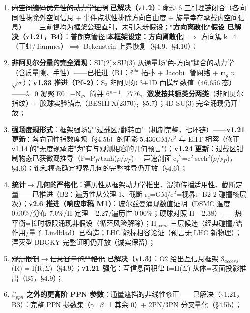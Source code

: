 \documentclass[UTF8,fontset=windows]{csoarticle}
\newcommand{\mtag}[1]{\textbf{[#1]}}
\newcommand{\up}[1]{\ensuremath{^{#1}}}
\newcommand{\down}[1]{\ensuremath{_{#1}}}
\begin{document}
\begin{enumerate}
\item \sout{内空间编码优先性的动力学证明} \textbf{\checkmark 已解决（v1.2）}：命题 6 三引理链闭合（各向同性抹除外空间信息 + 事件点状性排除方向自由度 + 旋量幸存承载内空间信息）------三前提均为框架公理直引，未引入新假设；\textbf{"方向离散化"假设 \checkmark 已解决（v1.21，B4）}：普朗克管径\mtag{本框架设定：方向离散化}\ensuremath{\implies} 方向簇 k=4（王虹/Tammes）\ensuremath{\implies} Bekenstein 上界恢复（\S{}4.9、\S{}4.10）；
\item \textbf{非阿贝尔分量的完全涌现}：SU(2)\ensuremath{\times}SU(3) 从通量场"色-方向"耦合的动力学（含质量隙、手性）------\checkmark 已推进（B1：f\up{abc} 拓扑 + Jacobi=管网络 + m\down{g}\ensuremath{\approx}\ensuremath{\sqrt{\sigma{}}}）；\textbf{v1.33 推进（P0-2）}：S\down{3} 非阿贝尔 3+1D 面模型数值（46,656 态）------\ensuremath{\lambda}=0 凝聚 E0=\ensuremath{-}N\down{c}、简并 6\up{n-1}=7776、\textbf{激发按共轭类分两类}（非阿贝尔指纹）+ 胶球实验锚点（BESIII X(2370)，\S{}5.7）；4D SU(3) 完全涌现仍开放；
\item \textbf{强场度规形式}：框架强场是"过载区/翻转面"（机制完整，七环链）------\textbf{v1.21 更新}：各向同性指数度规（\S{}4.5b）的阴影 5.436GM/c\up{2} 与 EHT 相容（修正 v1.14 的"无度规承诺"为"有与观测相容的几何预言"）；\textbf{v1.24 更新}：过载区钳制物态已获微观推导（P=P\down{P}\ensuremath{\cdot}tanh(\ensuremath{\rho}/\ensuremath{\rho}\down{P}) + 声速剖面 c\down{s}\up{2}=c\up{2}\ensuremath{\cdot}sech\up{2}(\ensuremath{\rho}/\ensuremath{\rho}\down{P})，\S{}4.6）；饱和模态确定视界几何的完整推导仍开放（\S{}4.6）；
\item \textbf{统计\ensuremath{\to}几何的严格化}：遍历性从框架动力学推出、混沌传播适用性、截断定量------\checkmark 已推进（B2：遍历性从公理 1、截断 r\down{c}=GM/c\up{2}=视界、B2-2 碰撞核层次）；\textbf{v2.6 推进（响应审稿 M1）}：玻尔兹曼涌现数值证明（DSMC 温度 0.00\%/分布 7.0\%/H 定理 \ensuremath{-}2.27/遍历性 0.00\%；硬球对照 H \ensuremath{-}2.38）------热平衡=长时极限涌现非假设（循环风险解除）；H\down{event} 三层候选（经典碰撞/谱作用/量子 Lindblad）已构造；LHC 能标相容论证（预言无 LHC 新物理）；湮灭型 BBGKY 完整证明仍开放（诚实保留）；
\item \sout{观测限制\ensuremath{\to}信息容量的严格化} \textbf{\checkmark 已解决（v1.3）}：O2 给出互信息框架 S\down{access}(R) = I(R;\ensuremath{\Sigma})（\S{}4.9）；\textbf{v1.21 强化}：互信息面积律 I=H(\ensuremath{\Sigma}) 从体=表面投影推出（B5，\S{}4.9）；
\item \textbf{\ensuremath{\beta}\down{ppn} 之外的更高阶 PPN 参数}：通量遮挡的非线性修正------\checkmark 已解决（v1.21，B3）：完整 PPN 参数集（\ensuremath{\gamma}=\ensuremath{\beta}=1 其余 0）+ 2PN/3PN 分叉量化（\S{}4.5b）；

\end{enumerate}
\end{document}
